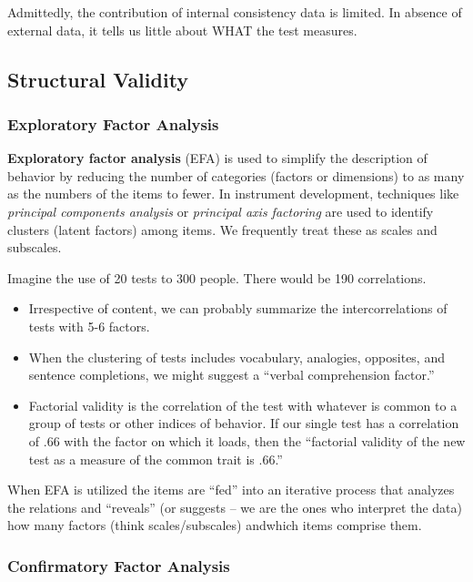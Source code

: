 \documentclass[
  english,
]{book}
\providecommand{\tightlist}{%
  \setlength{\itemsep}{0pt}\setlength{\parskip}{0pt}}
\begin{document}
Admittedly, the contribution of internal consistency data is limited. In absence of external data, it tells us little about WHAT the test measures.

\hypertarget{structural-validity}{%
\subsection{Structural Validity}\label{structural-validity}}

\hypertarget{exploratory-factor-analysis}{%
\subsubsection{Exploratory Factor Analysis}\label{exploratory-factor-analysis}}

\textbf{Exploratory factor analysis} (EFA) is used to simplify the description of behavior by reducing the number of categories (factors or dimensions) to as many as the numbers of the items to fewer. In instrument development, techniques like \emph{principal components analysis} or \emph{principal axis factoring} are used to identify clusters (latent factors) among items. We frequently treat these as scales and subscales.

Imagine the use of 20 tests to 300 people. There would be 190 correlations.

\begin{itemize}
\tightlist
\item
  Irrespective of content, we can probably summarize the intercorrelations of tests with 5-6 factors.
\item
  When the clustering of tests includes vocabulary, analogies, opposites, and sentence completions, we might suggest a ``verbal comprehension factor.''
\item
  Factorial validity is the correlation of the test with whatever is common to a group of tests or other indices of behavior. If our single test has a correlation of .66 with the factor on which it loads, then the ``factorial validity of the new test as a measure of the common trait is .66.''
\end{itemize}

When EFA is utilized the items are ``fed'' into an iterative process that analyzes the relations and ``reveals'' (or suggests -- we are the ones who interpret the data) how many factors (think scales/subscales) andwhich items comprise them.

\hypertarget{confirmatory-factor-analysis}{%
\subsubsection{Confirmatory Factor Analysis}\label{confirmatory-factor-analysis}}
\end{document}
